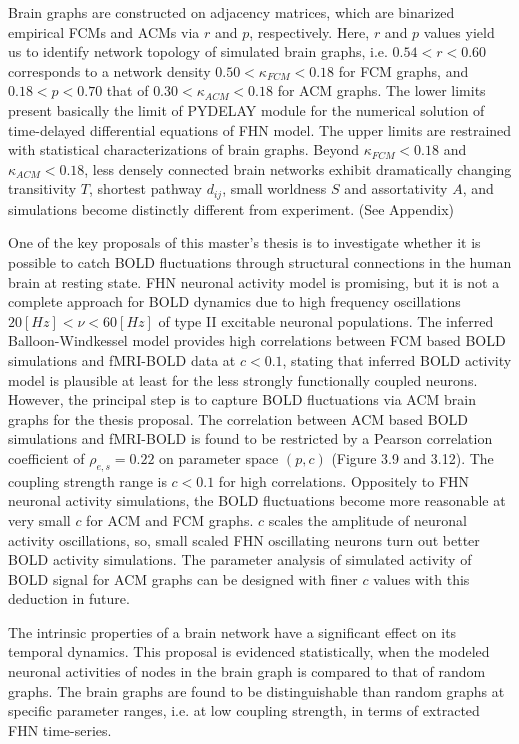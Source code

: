 Brain graphs are constructed on adjacency matrices, which are binarized empirical FCMs and ACMs via $r$ and $p$, respectively. Here, $r$ and $p$ values yield us to identify network topology of simulated brain graphs, i.e.  $0.54<r<0.60$ corresponds to a network density $0.50< \kappa_{FCM} <0.18$ for FCM graphs, and $0.18<p<0.70$ that of $0.30< \kappa_{ACM} <0.18$ for ACM graphs. The lower limits present basically the limit of \textsc{PYDELAY} module for the numerical solution of time-delayed differential equations of FHN model. The upper limits are restrained with statistical characterizations of brain graphs. Beyond $\kappa_{FCM} <0.18$ and $\kappa_{ACM}<0.18$, less densely connected brain networks exhibit dramatically changing transitivity $T$, shortest pathway $d_{ij}$, small worldness $S$ and assortativity $A$, and simulations become distinctly different from experiment. (See Appendix)

One of the key proposals of this master's thesis is to investigate whether it is possible to catch BOLD fluctuations through structural connections in the human brain at resting state. FHN neuronal activity model is promising, but it is not a complete approach for BOLD dynamics due to high frequency oscillations $20[Hz]< \nu <60 [Hz]$ of type II excitable neuronal populations. The inferred Balloon-Windkessel model provides high correlations between FCM based BOLD simulations and fMRI-BOLD data at $c<0.1$, stating that inferred BOLD activity model is plausible at least for the less strongly functionally coupled neurons. However, the principal step is to capture BOLD fluctuations via ACM brain graphs for the thesis proposal. The correlation between ACM based BOLD simulations and fMRI-BOLD is found to be restricted by a Pearson correlation coefficient of $\rho_{e,s}=0.22$ on parameter space $(p,c)$ (Figure 3.9 and 3.12). The coupling strength range is $c<0.1$ for high correlations. Oppositely to FHN neuronal activity simulations, the BOLD fluctuations become more reasonable at very small $c$ for ACM and FCM graphs. $c$ scales the amplitude of neuronal activity oscillations, so, small scaled FHN  oscillating neurons turn out better BOLD activity simulations. The parameter analysis of simulated activity of BOLD signal for ACM graphs can be designed with finer $c$ values with this deduction in future. 

The intrinsic properties of a brain network have a significant effect on its temporal dynamics. This proposal is evidenced statistically, when the modeled neuronal activities of nodes in the brain graph is compared to that of random graphs. The brain graphs are found to be distinguishable than random graphs at specific parameter ranges, i.e. at low coupling strength, in terms of extracted FHN time-series. 
 

 

